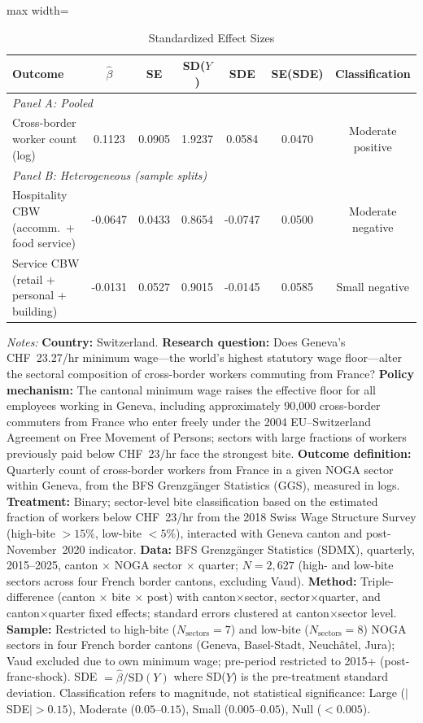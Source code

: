 \begin{table}[htbp]
\centering
\caption{Standardized Effect Sizes}
\label{tab:sde}
\begin{adjustbox}{max width=\textwidth}
\begin{tabular}{lcccccc}
\toprule
Outcome & $\hat{\beta}$ & SE & SD($Y$) & SDE & SE(SDE) & Classification \\
\midrule
\multicolumn{7}{l}{\textit{Panel A: Pooled}} \\
Cross-border worker count (log) & 0.1123 & 0.0905 & 1.9237 & 0.0584 & 0.0470 & Moderate positive \\
\midrule
\multicolumn{7}{l}{\textit{Panel B: Heterogeneous (sample splits)}} \\
Hospitality CBW (accomm.~+ food service) & -0.0647 & 0.0433 & 0.8654 & -0.0747 & 0.0500 & Moderate negative \\
Service CBW (retail + personal + building) & -0.0131 & 0.0527 & 0.9015 & -0.0145 & 0.0585 & Small negative \\
\bottomrule
\end{tabular}
\end{adjustbox}
\begin{tablenotes}
\footnotesize
\item \textit{Notes:} \textbf{Country:} Switzerland. \textbf{Research question:} Does Geneva's CHF~23.27/hr minimum wage---the world's highest statutory wage floor---alter the sectoral composition of cross-border workers commuting from France? \textbf{Policy mechanism:} The cantonal minimum wage raises the effective floor for all employees working in Geneva, including approximately 90,000 cross-border commuters from France who enter freely under the 2004 EU--Switzerland Agreement on Free Movement of Persons; sectors with large fractions of workers previously paid below CHF~23/hr face the strongest bite. \textbf{Outcome definition:} Quarterly count of cross-border workers from France in a given NOGA sector within Geneva, from the BFS Grenz\-g\"an\-ger Statistics (GGS), measured in logs. \textbf{Treatment:} Binary; sector-level bite classification based on the estimated fraction of workers below CHF~23/hr from the 2018 Swiss Wage Structure Survey (high-bite $>15\%$, low-bite $<5\%$), interacted with Geneva canton and post-November~2020 indicator. \textbf{Data:} BFS Grenz\-g\"an\-ger Statistics (SDMX), quarterly, 2015--2025, canton $\times$ NOGA sector $\times$ quarter; $N = 2,627$ (high- and low-bite sectors across four French border cantons, excluding Vaud). \textbf{Method:} Triple-difference (canton $\times$ bite $\times$ post) with canton$\times$sector, sector$\times$quarter, and canton$\times$quarter fixed effects; standard errors clustered at canton$\times$sector level. \textbf{Sample:} Restricted to high-bite ($N_{\text{sectors}}=7$) and low-bite ($N_{\text{sectors}}=8$) NOGA sectors in four French border cantons (Geneva, Basel-Stadt, Neuch\^atel, Jura); Vaud excluded due to own minimum wage; pre-period restricted to 2015+ (post-franc-shock). SDE $= \hat{\beta} / \text{SD}(Y)$ where SD($Y$) is the pre-treatment standard deviation. Classification refers to magnitude, not statistical significance: Large ($|$SDE$| > 0.15$), Moderate ($0.05$--$0.15$), Small ($0.005$--$0.05$), Null ($< 0.005$).
\end{tablenotes}
\end{table}
